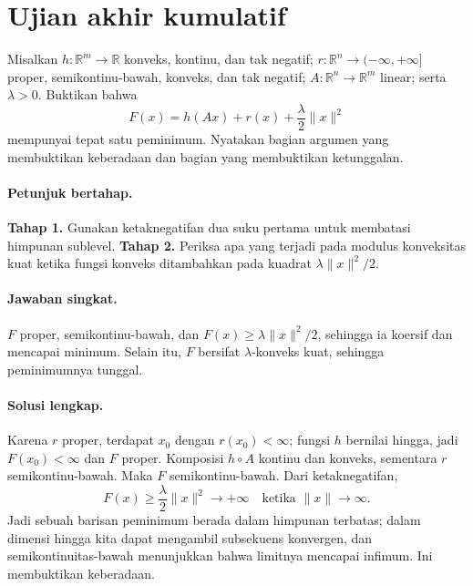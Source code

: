 
\section{Ujian akhir kumulatif}
\label{orig03:final}

\begin{exercise}
\label{orig03:final:exercise:0001}
Misalkan $h:\mathbb R^m\to\mathbb R$ konveks, kontinu, dan tak negatif;
$r:\mathbb R^n\to(-\infty,+\infty]$ proper, semikontinu-bawah, konveks, dan
tak negatif; $A:\mathbb R^n\to\mathbb R^m$ linear; serta $\lambda>0$.
Buktikan bahwa
\[
 F(x)=h(Ax)+r(x)+\frac\lambda2\lVert x\rVert^2
\]
mempunyai tepat satu peminimum. Nyatakan bagian argumen yang membuktikan
keberadaan dan bagian yang membuktikan ketunggalan.
\end{exercise}

\paragraph{Petunjuk bertahap.}
\label{orig03:final:hint:0001}
\textbf{Tahap 1.} Gunakan ketaknegatifan dua suku pertama untuk membatasi
himpunan sublevel.
\textbf{Tahap 2.} Periksa apa yang terjadi pada modulus konveksitas kuat ketika
fungsi konveks ditambahkan pada kuadrat $\lambda\lVert x\rVert^2/2$.

\paragraph{Jawaban singkat.}
\label{orig03:final:answer:0001}
$F$ proper, semikontinu-bawah, dan
$F(x)\ge\lambda\lVert x\rVert^2/2$, sehingga ia koersif dan mencapai minimum.
Selain itu, $F$ bersifat $\lambda$-konveks kuat, sehingga peminimumnya tunggal.

\paragraph{Solusi lengkap.}
\label{orig03:final:solution:0001}
Karena $r$ proper, terdapat $x_0$ dengan $r(x_0)<\infty$; fungsi $h$ bernilai
hingga, jadi $F(x_0)<\infty$ dan $F$ proper. Komposisi $h\circ A$ kontinu dan
konveks, sementara $r$ semikontinu-bawah. Maka $F$ semikontinu-bawah. Dari
ketaknegatifan,
\[
 F(x)\ge\frac\lambda2\lVert x\rVert^2\longrightarrow+\infty
 \quad\text{ketika }\lVert x\rVert\to\infty.
\]
Jadi sebuah barisan peminimum berada dalam himpunan terbatas; dalam dimensi
hingga kita dapat mengambil subsekuens konvergen, dan semikontinuitas-bawah
menunjukkan bahwa limitnya mencapai infimum. Ini membuktikan keberadaan.

